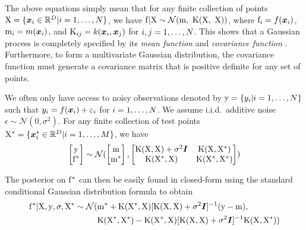 The above equations simply mean that for any finite collection of points $\mathrm{X} = \{\boldsymbol{x}_i \in \mathbb{R}^D \vert i=1,\dots,N\}$, we have $\mathrm{f} \vert \mathrm{X} \sim \mathcal{N}(\mathrm{m},\ \mathrm{K}(\mathrm{X},\ \mathrm{X}))$, where $\mathrm{f}_i = f(\boldsymbol{x}_i)$, $\mathrm{m}_i = m(\boldsymbol{x}_i)$, and $\mathrm{K}_{ij} = k(\boldsymbol{x}_i, \boldsymbol{x}_j)$ for $i,j=1,\dots,N$.
This shows that a Gaussian process is completely specified by its \emph{mean function}  and \emph{covariance function} .
Furthermore, to form a multivariate Gaussian distribution, the covariance function must generate a covariance matrix that is positive definite for any set of points.

We often only have access to noisy observations denoted by $\mathrm{y} = \{y_i \vert i=1,\dots,N\}$ such that $y_i = f(\boldsymbol{x}_i) + \varepsilon_i$ for $i=1,\dots,N$.
We assume i.i.d.\ additive noise $\epsilon \sim \mathcal{N}(0, \sigma^2)$.
For any finite collection of test points $\mathrm{X}^* = \{\boldsymbol{x}^*_i \in \mathbb{R}^D \vert i=1,\dots,M\}$, we have
\begin{align}
    \begin{bmatrix}
        \mathrm{y} 
        \\ 
        \mathrm{f}^*
    \end{bmatrix}
    \sim 
    \mathcal{N}(
        \begin{bmatrix}
            \mathrm{m} 
            \\ 
            \mathrm{m}^*
        \end{bmatrix}
        ,
        \begin{bmatrix}
            \mathrm{K}(\mathrm{X}, \mathrm{X}) + \sigma^2\boldsymbol{I} 
                & \mathrm{K}(\mathrm{X}, \mathrm{X}^*) 
            \\ 
            \mathrm{K}(\mathrm{X}^*, \mathrm{X}) 
                & \mathrm{K}(\mathrm{X}^*, \mathrm{X}^*)
        \end{bmatrix}
    ) \nonumber
\end{align}

The posterior on $\mathrm{f}^*$ can then be easily found in closed-form using the standard conditional Gaussian distribution formula to obtain
\begin{align}
    \mathrm{f}^* \vert \mathrm{X},\mathrm{y},\sigma,\mathrm{X}^*
    \sim
    \mathcal{N}(
        & \mathrm{m}^* 
            + \mathrm{K}(\mathrm{X}^*, \mathrm{X})[\mathrm{K}(\mathrm{X}, \mathrm{X}) + \sigma^2\boldsymbol{I}]^{-1}(\mathrm{y} - \mathrm{m}),
        \nonumber
        \label{eq-gp-posterior}
        \\        
        & \mathrm{K}(\mathrm{X}^*, \mathrm{X}^*) 
            - \mathrm{K}(\mathrm{X}^*, \mathrm{X})[\mathrm{K}(\mathrm{X}, \mathrm{X}) + \sigma^2\boldsymbol{I}]^{-1}\mathrm{K}(\mathrm{X}, \mathrm{X}^*)
    )
\end{align}

